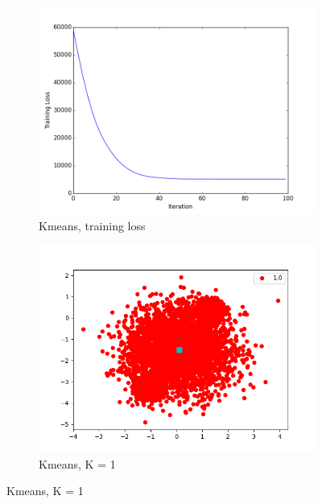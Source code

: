 \documentclass[12pt,letterpaper]{article}
\begin{document}
\begin{figure}
    \centering
    \begin{subfigure}[b]{0.45\textwidth}
        \includegraphics[width=\textwidth]{imgs/kmeans_train_loss.png}
        \caption{Kmeans, training loss}
        \label{kmeans_loss}
    \end{subfigure}
    \begin{subfigure}[b]{0.45\textwidth}
        \includegraphics[width=\textwidth]{imgs/kmeans_K_1.png}
        \caption{Kmeans, K = 1}
        \label{kmeans_1}
    \end{subfigure}


\end{figure}
\end{document}
